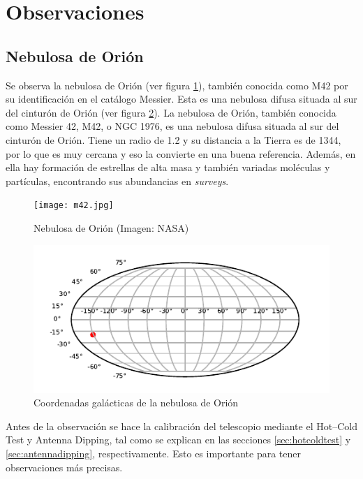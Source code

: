 \section{Observaciones}

\subsection{Nebulosa de Orión}

Se observa la nebulosa de Orión (ver figura \ref{fig:m42}), también conocida como M42 por su identificación en el catálogo Messier. Esta es una nebulosa difusa situada al sur del cinturón de Orión (ver figura \ref{fig:lb}).
La nebulosa de Orión, también conocida como Messier 42, M42, o NGC 1976, es una nebulosa difusa situada al sur del cinturón de Orión. Tiene un radio de \SI{1.2}{\lightyear} y su distancia a la Tierra es de \SI{1344}{\lightyear}, por lo que es muy cercana y eso la convierte en una buena referencia. Además, en ella hay formación de estrellas de alta masa y también variadas moléculas y partículas, encontrando sus abundancias en \textit{surveys}.

\begin{figure}[p]
	\centering
	\texttt{[image: m42.jpg]}
	\caption{Nebulosa de Orión (Imagen: NASA)}
	\label{fig:m42}
\end{figure}

\begin{figure}[p]
	\centering
	\includegraphics{lb.pdf}
	\caption{Coordenadas galácticas de la nebulosa de Orión}
	\label{fig:lb}
\end{figure}

Antes de la observación se hace la calibración del telescopio mediante el Hot--Cold Test y Antenna Dipping, tal como se explican en las secciones \ref{sec:hotcoldtest} y \ref{sec:antennadipping}, respectivamente. Esto es importante para tener observaciones más precisas.

